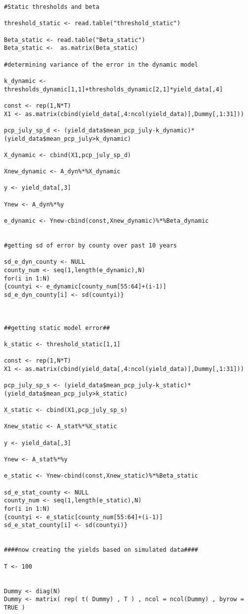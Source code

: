 \begin{lstlisting}
#Static thresholds and beta

threshold_static <- read.table("threshold_static")

Beta_static <- read.table("Beta_static")
Beta_static <-  as.matrix(Beta_static)

#determining variance of the error in the dynamic model

k_dynamic <- thresholds_dynamic[1,1]+thresholds_dynamic[2,1]*yield_data[,4]

const <- rep(1,N*T)
X1 <- as.matrix(cbind(yield_data[,4:ncol(yield_data)],Dummy[,1:31]))

pcp_july_sp_d <- (yield_data$mean_pcp_july-k_dynamic)*(yield_data$mean_pcp_july>k_dynamic)

X_dynamic <- cbind(X1,pcp_july_sp_d)

Xnew_dynamic <- A_dyn%*%X_dynamic

y <- yield_data[,3]

Ynew <- A_dyn%*%y

e_dynamic <- Ynew-cbind(const,Xnew_dynamic)%*%Beta_dynamic


#getting sd of error by county over past 10 years

sd_e_dyn_county <- NULL
county_num <- seq(1,length(e_dynamic),N)
for(i in 1:N)
{countyi <- e_dynamic[county_num[55:64]+(i-1)]
sd_e_dyn_county[i] <- sd(countyi)}



##getting static model error##

k_static <- threshold_static[1,1]

const <- rep(1,N*T)
X1 <- as.matrix(cbind(yield_data[,4:ncol(yield_data)],Dummy[,1:31]))

pcp_july_sp_s <- (yield_data$mean_pcp_july-k_static)*(yield_data$mean_pcp_july>k_static)

X_static <- cbind(X1,pcp_july_sp_s)

Xnew_static <- A_stat%*%X_static

y <- yield_data[,3]

Ynew <- A_stat%*%y

e_static <- Ynew-cbind(const,Xnew_static)%*%Beta_static

sd_e_stat_county <- NULL
county_num <- seq(1,length(e_static),N)
for(i in 1:N)
{countyi <- e_static[county_num[55:64]+(i-1)]
sd_e_stat_county[i] <- sd(countyi)}


####now creating the yields based on simulated data####

T <- 100


Dummy <- diag(N)
Dummy <- matrix( rep( t( Dummy) , T ) , ncol = ncol(Dummy) , byrow = TRUE )



\end{lstlisting}
